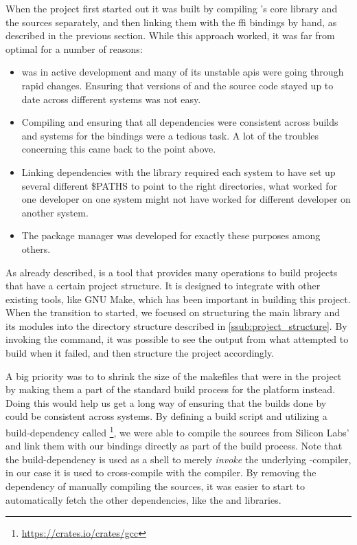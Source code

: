 When the project first started out it was built by compiling {\rust}'s core library and the {\emlib} {\C} sources separately, and then linking them with the \gls{ffi} bindings by hand, as described in the previous section.
While this approach worked, it was far from optimal for a number of reasons:

\begin{itemize}
    \item {\rust} was in active development and many of its unstable \glspl{api} were going through rapid changes.
    Ensuring that versions of {\rustc} and the {\rust} source code stayed up to date across different systems was not easy.
    \item Compiling and ensuring that all dependencies were consistent across builds and systems for the bindings were a tedious task.
    A lot of the troubles concerning this came back to the point above.
    \item Linking dependencies with the library required each system to have set up several different \$PATHS to point to the right directories, what worked for one developer on one system might not have worked for different developer on another system.
    \item The {\cargo} package manager was developed for exactly these purposes among others.
\end{itemize}

As already described, {\cargo} is a tool that provides many operations to build {\rust} projects that have a certain project structure.
It is designed to integrate with other existing tools, like GNU Make, which has been important in  building this project.
When the transition to {\cargo} started, we focused on structuring the main library and its modules into the directory structure described in \autoref{ssub:project_structure}.
By invoking the  command, it was possible to see the output from what {\cargo} attempted to build when it failed, and then structure the project accordingly.

A big priority was to to shrink the size of the makefiles that were in the project by making them a part of the standard build process for the {\rg} platform instead.
Doing this would help us get a long way of ensuring that the builds done by {\cargo} could be consistent across systems.
By defining a {\rust} build script and utilizing a {\rust} build-dependency called \footnote{\url{https://crates.io/crates/gcc}}, we were able to compile the {\C} sources from Silicon Labs' {\emlib} and link them with our bindings directly as part of the build process.
Note that the  build-dependency is used as a shell to merely \emph{invoke} the underlying {\C}-compiler, in our case it is used to cross-compile with the {\armgcc} compiler.
By removing the dependency of manually compiling the {\C} sources, it was easier to start to automatically fetch the other dependencies, like the {\core} and  libraries.

